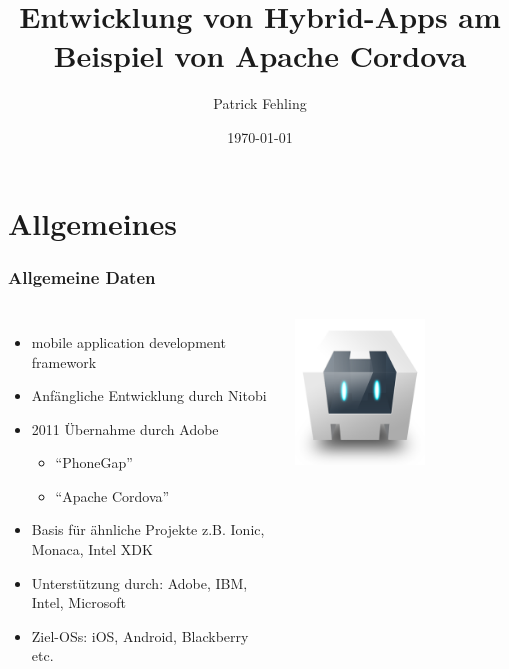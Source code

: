\documentclass[xcolor=dvipsnames]{beamer}
\title[Entwicklung von Hybrid-Apps am Beispiel von Apache Cordova]{Entwicklung von Hybrid-Apps am Beispiel von Apache Cordova}
\author{Patrick Fehling}
\institute{Hochschule für Technik und Wirtschaft Berlin}
\date{\today}
\begin{document}
\maketitle
\frame{\tableofcontents}


\section{Allgemeines}

\begin{frame}\frametitle{Allgemeine Daten}
	\begin{columns}[t,onlytextwidth]
		\begin{itemize}
			\item mobile application development framework
			\item Anfängliche Entwicklung durch Nitobi
			\item 2011 Übernahme durch Adobe
			\begin{itemize}
				\item "`PhoneGap"'
				\item "`Apache Cordova"'
			\end{itemize}
			\item Basis für ähnliche Projekte z.B. Ionic, Monaca, Intel XDK
			\item Unterstützung durch: Adobe, IBM, Intel, Microsoft
			\item Ziel-OSs: iOS, Android, Blackberry etc.
		\end{itemize}
		\centering
		
		\includegraphics[width=0.6\textwidth]{pictures/cordova_logo}
		

\end{columns}
\end{frame}
\end{document}
